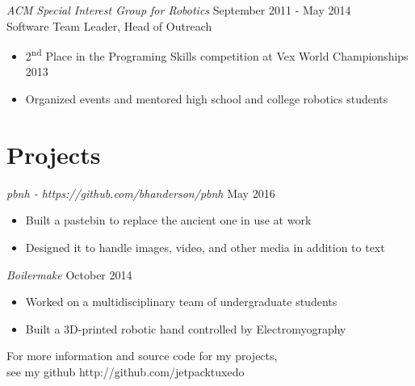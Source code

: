 \documentclass[line,margin]{res}
\newenvironment{tightcenter}{%
  \setlength\topsep{0pt}
  \setlength\parskip{0pt}
  \begin{center}
  }{\end{center}}
\begin{document}
\begin{resume}
    {\sl ACM Special Interest Group for Robotics} \hfill September 2011 - May 2014 \\
      Software Team Leader, Head of Outreach
      \begin{itemize}  \itemsep -2pt %
        \item 2\textsuperscript{nd} Place in the Programing Skills competition at Vex World Championships 2013
        \item Organized events and mentored high school and college robotics students
      \end{itemize}
    
  \section{\textcolor{TealBlue}{Projects}}
    {\sl pbnh - https://github.com/bhanderson/pbnh} \hfill May 2016
      \begin{itemize}  \itemsep -2pt %
        \item Built a pastebin to replace the ancient one in use at work
        \item Designed it to handle images, video, and other media in addition to text
      \end{itemize}

    {\sl Boilermake} \hfill October 2014
      \begin{itemize}  \itemsep -2pt %
        \item Worked on a multidisciplinary team of undergraduate students
        \item Built a 3D-printed robotic hand controlled by Electromyography
      \end{itemize}

\end{resume}

\vfill
\begin{tightcenter}
For more information and source code for my projects,\\
see my github http://github.com/jetpacktuxedo
\end{tightcenter}
\end{document}
